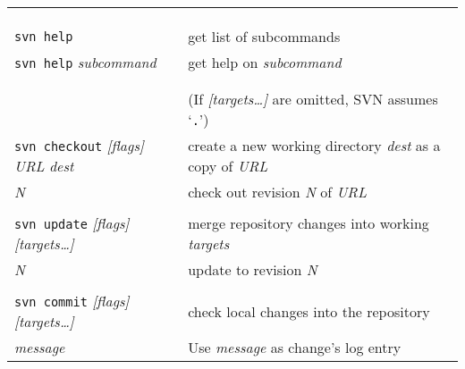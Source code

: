 \documentclass{report}
\begin{document}
\hspace{-0.7in}
\begin{tabular}{ll}
\vspace{0.1in} \hspace{-0.1in}{\bf\LARGE SVN Quick Reference}
						& \\ \\

\vspace{0.1in} \hspace{-0.1in}{\bf\Large Getting Help}
                                                &  \\

{\tt svn help}	                      		&
get list of subcommands                          \\

{\tt svn help} {\sl subcommand}  		&
get help on {\sl subcommand}		          \\


\\
\\
\vspace{0.1in} \hspace{-0.1in}{\bf\Large Working Copies}   &
(If {\sl [targets\dots]} are omitted, SVN assumes `{\tt .}')  \\

{\tt svn checkout} {\sl [flags]} {\sl URL} {\sl dest} &
create a new working directory {\sl dest} as a copy of {\sl URL} \\

\hspace{0.5in}{\tt -r} {\sl N}		&
check out revision {\sl N} of {\sl URL}	  \\

\\
{\tt svn update} {\sl [flags]} {\sl [targets\dots]}	&
merge repository changes into working {\sl targets}	  \\

\hspace{0.5in}{\tt -r} {\sl N}		&
update to revision {\sl N}		  \\

\\
{\tt svn commit} {\sl [flags]} {\sl [targets\dots]}	&
check local changes into the repository		  \\

\hspace{0.5in}{\tt -m} {\sl message}		&
Use {\sl message} as change's log entry		 \\


\end{tabular}
\end{document}
